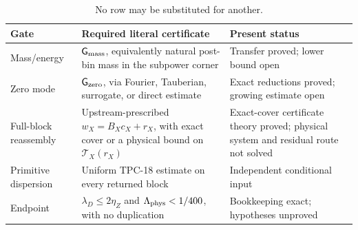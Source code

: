 \begin{table}[H]
\centering
\small
\begin{tabularx}{\textwidth}{@{}
  >{\raggedright\arraybackslash}p{}
  >{\raggedright\arraybackslash}X
  >{\raggedright\arraybackslash}p{}@{}}
\toprule
Gate & Required literal certificate & Present status\\
\midrule
Mass/energy
&
\(\mathsf G_{\rm mass}\), equivalently natural post-bin mass in the
subpower corner
&
Transfer proved; lower bound open
\\
\addlinespace
Zero mode
&
\(\mathsf G_{\rm zero}\), via Fourier, Tauberian, surrogate, or direct
estimate
&
Exact reductions proved; growing estimate open
\\
\addlinespace
Full-block reassembly
&
Upstream-prescribed \(w_X=B_Xc_X+r_X\), with exact cover or a
physical bound on \(\mathcal T_X(r_X)\)
&
Exact-cover certificate theory proved; physical system and residual
route not solved
\\
\addlinespace
Primitive dispersion
&
Uniform TPC-18 estimate on every returned block
&
Independent conditional input
\\
\addlinespace
Endpoint
&
\(\lambda_D\le2\eta_Z\) and
\(\Lambda_{\rm phys}<1/400\), with no duplication
&
Bookkeeping exact; hypotheses unproved
\\
\bottomrule
\end{tabularx}
\caption{No row may be substituted for another.}
\label{tab:remaining-gates}
\end{table}

